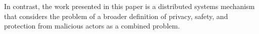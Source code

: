 In contrast, the work presented in this paper is a distributed systems mechanism that considers the problem of a broader definition of privacy, safety, and protection from malicious actors as a combined problem.





